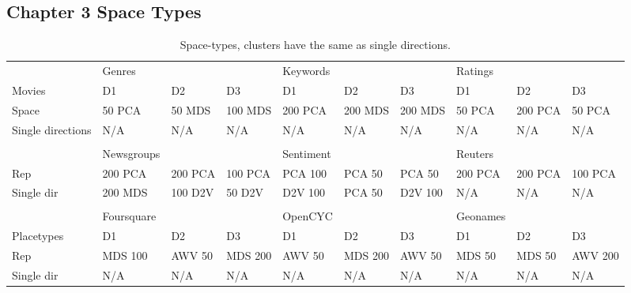 \subsection{Chapter 3 Space Types}
\begin{landscape}
	\begin{table}[]
		\begin{tabular}{llllllllll}
			& Genres     &         &         & Keywords  &         &         & Ratings  &         &         \\
			Movies            & D1         & D2      & D3      & D1        & D2      & D3      & D1       & D2      & D3      \\
			Space             & 50 PCA     & 50 MDS  & 100 MDS & 200 PCA   & 200 MDS & 200 MDS & 50 PCA   & 200 PCA & 50 PCA  \\
			Single directions & N/A        & N/A     & N/A     & N/A       & N/A     & N/A     & N/A      & N/A     & N/A     \\
			&            &         &         &           &         &         &          &         &         \\
			& Newsgroups &         &         & Sentiment &         &         & Reuters  &         &         \\
			Rep               & 200 PCA    & 200 PCA & 100 PCA & PCA 100   & PCA 50  & PCA 50  & 200 PCA  & 200 PCA & 100 PCA \\
			Single dir        & 200 MDS    & 100 D2V & 50 D2V  & D2V 100   & PCA 50  & D2V 100 & N/A      & N/A     & N/A     \\
			&            &         &         &           &         &         &          &         &         \\
			& Foursquare &         &         & OpenCYC   &         &         & Geonames &         &         \\
			Placetypes        & D1         & D2      & D3      & D1        & D2      & D3      & D1       & D2      & D3      \\
			Rep               & MDS 100    & AWV 50  & MDS 200 & AWV 50    & MDS 200 & AWV 50  & MDS 50   & MDS 50  & AWV 200 \\
			Single dir        & N/A        & N/A     & N/A     & N/A       & N/A     & N/A     & N/A      & N/A     & N/A    
		\end{tabular}\caption{Space-types, clusters have the same as single directions.}
	\end{table}
\end{landscape}


